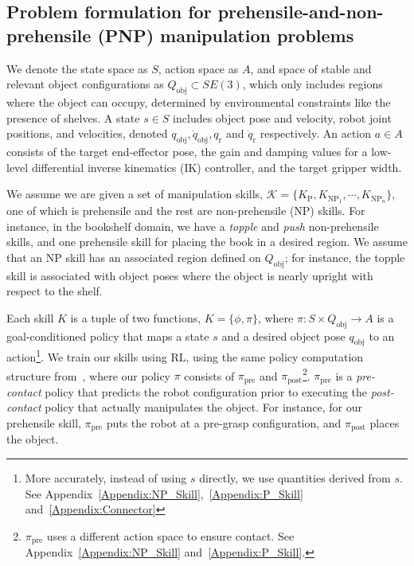\subsection{Problem formulation for prehensile-and-non-prehensile (PNP) manipulation problems}\label{method:PF}
\newcommand{\skillset}{\mathcal{K}}
\newcommand{\skill}{K}
\newcommand{\npskill}{K_{\text{NP}}}
\newcommand{\pskill}{K_{\text{P}}}
\newcommand{\applicabilitychecker}{\phi}
\newcommand{\policy}{\pi}
\newcommand{\qobj}{q_\text{obj}}
\newcommand{\qobjg}{q_\text{obj}^g}
\newcommand{\vobj}{\dot{q}_\text{obj}}
\newcommand{\Qobj}{Q_\text{obj}}
\newcommand{\qrobot}{q_\text{r}}
\newcommand{\vrobot}{\dot{q}_\text{r}}
\newcommand{\fsim}{f_{\text{sim}}}
\newcommand{\skillplan}{\tau_{\text{skill}}}

\newcommand{\node}{v}
\newcommand{\pipre}{\pi_{\text{pre}}}
\newcommand{\pipost}{\pi_{\text{post}}}


We denote the state space as $S$, action space as $A$, and space of stable and relevant object configurations as $\Qobj \subset SE(3)$, which only includes regions where the object can occupy, determined by environmental constraints like the presence of shelves. A state $s \in S$ includes object pose and velocity, robot joint positions, and velocities, denoted $\qobj, \vobj, \qrobot$ and $\vrobot$ respectively. An action $a \in  A$ consists of the target end-effector pose, the gain and damping values for a low-level differential inverse kinematics (IK) controller, and the target gripper width.

We assume we are given a set of manipulation skills, $\skillset=\{\pskill,K_{\text{NP}_1},\cdots,K_{\text{NP}_n}\}$, one of which is prehensile and the rest are non-prehensile (NP) skills. For instance, in the bookshelf domain, we have a \textit{topple} and \textit{push} non-prehensile skills, and one prehensile skill for placing the book in a desired region. We assume that an NP skill has an associated region defined on $\Qobj$; for instance, the topple skill is associated with object poses where the object is nearly upright with respect to the shelf. 

Each skill $K$ is a tuple of two functions, $K =\{ \applicabilitychecker, \pi\}$, where $\pi: S \times \Qobj \rightarrow A$ is a goal-conditioned policy that maps a state $s$ and a desired object pose $\qobj$ to an action\footnote{More accurately, instead of using $s$ directly, we use quantities derived from $s$. See Appendix~\ref{Appendix:NP_Skill},~\ref{Appendix:P_Skill} and~\ref{Appendix:Connector}}. We train our skills using RL, using the same policy computation structure from~\cite{kim2023pre}, where our policy $\pi$ consists of $\pipre$ and $\pipost$\footnote{$\pipre$ uses a different action space to ensure contact. See Appendix~\ref{Appendix:NP_Skill} and~\ref{Appendix:P_Skill}.}. $\pipre$ is a \emph{pre-contact} policy that predicts the robot configuration prior to executing the \emph{post-contact} policy that actually manipulates the object. For instance, for our prehensile skill, $\pipre$ puts the robot at a pre-grasp configuration, and $\pipost$ places the object. 

